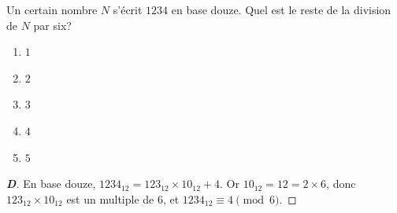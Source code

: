 % 
%
Un certain nombre $N$ s'écrit $1234$ en base douze. Quel est le reste de la
division de $N$ par six?
\begin{enumerate}
  \item $1$
  \item $2$
  \item $3$
  \item $4$
  \item $5$
\end{enumerate}
%
%
\begin{proof}[\textbf{D}]
En base douze, $1234_{12} = 123_{12} \times 10_{12} + 4$.
Or $10_{12} = 12 = 2 \times 6$, donc $123_{12} \times 10_{12}$ est un multiple
de $6$, et $1234_{12} \equiv 4 \pmod{6}$.
\end{proof}